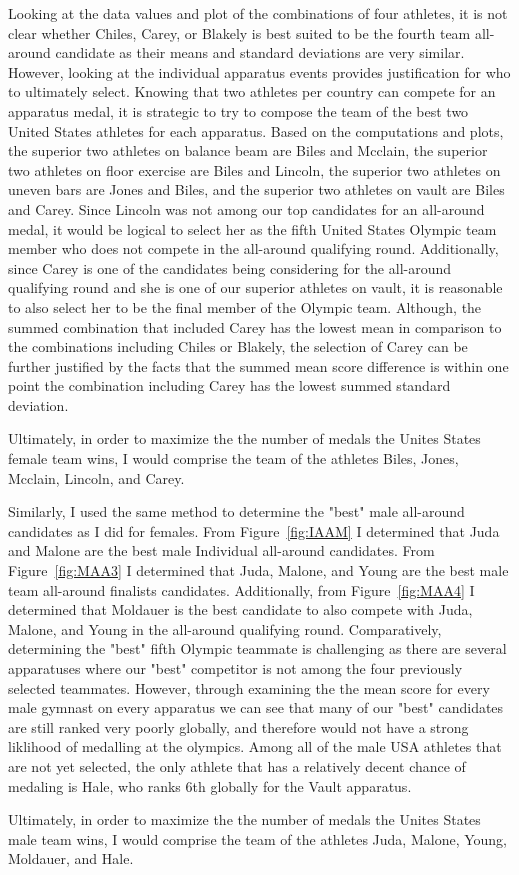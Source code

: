 \documentclass[12pt]{article}
\begin{document}
Looking at the data values and plot of the combinations of four athletes, it is not clear whether Chiles, Carey, or 
Blakely is best suited to be the fourth team all-around candidate as their means and standard deviations are very 
similar. However, looking at the individual apparatus events provides justification for who to ultimately select. 
Knowing that two athletes per country can compete for an apparatus medal, it is strategic to try to compose the 
team of the best two United States athletes for each apparatus. Based on the computations and plots, the superior two 
athletes on balance beam are Biles and Mcclain, the superior two athletes on floor exercise are Biles and Lincoln, 
the superior two athletes on uneven bars are Jones and Biles, and the superior two athletes on vault are Biles 
and Carey. Since Lincoln was not among our top candidates for an all-around medal, it would be logical to select her 
as the fifth United States Olympic team member who does not compete in the all-around qualifying round. Additionally, 
since Carey is one of the candidates being considering for the all-around qualifying round and she is one of our superior 
athletes on vault, it is reasonable to also select her to be the final member of the Olympic team. Although, the 
summed combination that included Carey has the lowest mean in comparison to the combinations including Chiles or 
Blakely, the selection of Carey can be further justified by the facts that the summed mean score difference is 
within one point the combination including Carey has the lowest summed standard deviation.

Ultimately, in order to maximize the the number of medals the Unites States female team wins, I would comprise the 
team of the athletes Biles, Jones, Mcclain, Lincoln, and Carey.

Similarly, I used the same method to determine the "best" male all-around candidates as I did for females. From 
Figure~\ref{fig:IAAM} I determined that Juda and Malone are the best male Individual all-around candidates. From 
Figure~\ref{fig:MAA3} I determined that Juda, Malone, and Young are the best male team all-around finalists 
candidates. Additionally, from Figure~\ref{fig:MAA4} I determined that Moldauer is the best candidate to also compete 
with Juda, Malone, and Young in the all-around qualifying round. Comparatively, determining the "best" fifth Olympic 
teammate is challenging as there are several apparatuses where our "best" competitor is not among the four 
previously selected teammates. However, through examining the the mean score for every male gymnast on every apparatus 
we can see that many of our "best" candidates are still ranked very poorly globally, and therefore would not have a 
strong liklihood of medalling at the olympics. Among all of the male USA athletes that are not yet selected, the only 
athlete that has a relatively decent chance of medaling is Hale, who ranks 6th globally for the Vault apparatus.

Ultimately, in order to maximize the the number of medals the Unites States male team wins, I would comprise the 
team of the athletes Juda, Malone, Young, Moldauer, and Hale.
\end{document}

